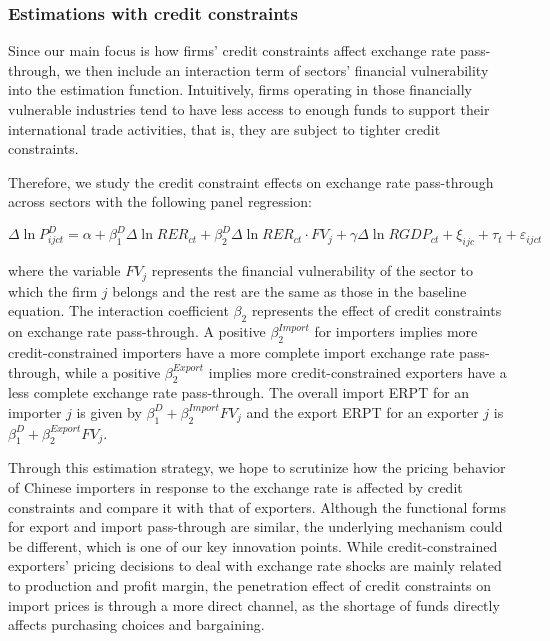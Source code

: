 \documentclass[12pt]{article}
\begin{document}
\subsubsection{Estimations with credit constraints}

Since our main focus is how firms' credit constraints affect exchange rate pass-through, we then include an interaction term of sectors’ financial vulnerability into the estimation function. Intuitively, firms operating in those financially vulnerable industries tend to have less access to enough funds to support their international trade activities, that is, they are subject to tighter credit constraints.

Therefore, we study the credit constraint effects on exchange rate pass-through across sectors with the following panel regression:

\begin{equation}
	\Delta \ln P^{D}_{ijct}=\alpha+\beta^D_{1} \Delta \ln RER_{ct}+\beta^D_{2} \Delta \ln RER_{ct} \cdot FV_{j}+\gamma \Delta \ln RGDP_{ct}+\xi_{ijc}+\tau_{t} +\varepsilon_{ijct}
	\label{eq.credit}
\end{equation}

where the variable $FV_{j}$ represents the financial vulnerability of the sector to which the firm $j$ belongs and the rest are the same as those in the baseline equation. The interaction coefficient $\beta_2$ represents the effect of credit constraints on exchange rate pass-through. A positive $\beta^{Import}_2$ for importers implies more credit-constrained importers have a more complete import exchange rate pass-through, while a positive $\beta^{Export}_2$ implies more credit-constrained exporters have a less complete exchange rate pass-through. The overall import ERPT for an importer $j$ is given by $\beta^D_{1} +\beta^{Import}_{2} FV_j$ and the export ERPT for an exporter $j$ is  $\beta^D_{1} +\beta^{Export}_{2} FV_j$.

Through this estimation strategy, we hope to scrutinize how the pricing behavior of Chinese importers in response to the exchange rate is affected by credit constraints and compare it with that of exporters. Although the functional forms for export and import pass-through are similar, the underlying mechanism could be different, which is one of our key innovation points. While credit-constrained exporters’ pricing decisions to deal with exchange rate shocks are mainly related to production and profit margin, the penetration effect of credit constraints on import prices is through a more direct channel, as the shortage of funds directly affects purchasing choices and bargaining.
\end{document}
